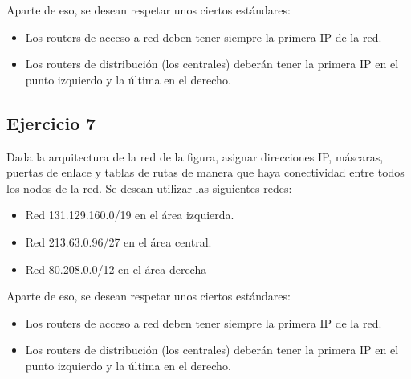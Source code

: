 \documentclass[letterpaper,10pt,spanish]{sphinxmanual}
\begin{document}
\begin{figure}[htbp]
\centering

\noindent{}
\end{figure}

\sphinxAtStartPar
Aparte de eso, se desean respetar unos ciertos estándares:
\begin{itemize}
\item {} 
\sphinxAtStartPar
Los routers de acceso a red deben tener siempre la primera IP de la red.

\item {} 
\sphinxAtStartPar
Los routers de distribución (los centrales) deberán tener la primera IP en el punto izquierdo y la última en el derecho.

\end{itemize}


\subsection{Ejercicio 7}
\label{\detokenize{t2_integracion_elementos/ejercicios_subredes_ipv4/ejercicios_dos_router:ejercicio-7}}
\sphinxAtStartPar
Dada la arquitectura de la red de la figura, asignar direcciones IP, máscaras, puertas de enlace y tablas de rutas de manera que haya conectividad entre todos
los nodos de la red. Se desean utilizar las siguientes redes:
\begin{itemize}
\item {} 
\sphinxAtStartPar
Red 131.129.160.0/19 en el área izquierda.

\item {} 
\sphinxAtStartPar
Red 213.63.0.96/27 en el área central.

\item {} 
\sphinxAtStartPar
Red 80.208.0.0/12 en el área derecha

\end{itemize}

\begin{figure}[htbp]
\centering

\noindent{}
\end{figure}

\sphinxAtStartPar
Aparte de eso, se desean respetar unos ciertos estándares:
\begin{itemize}
\item {} 
\sphinxAtStartPar
Los routers de acceso a red deben tener siempre la primera IP de la red.

\item {} 
\sphinxAtStartPar
Los routers de distribución (los centrales) deberán tener la primera IP en el punto izquierdo y la última en el derecho.

\end{itemize}
\end{document}
